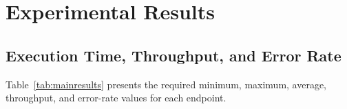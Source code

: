 \documentclass[11pt,a4paper]{article}
\begin{document}


\section{Experimental Results}

\subsection{Execution Time, Throughput, and Error Rate}

Table~\ref{tab:mainresults} presents the required minimum, maximum, average, throughput, and error-rate values for each endpoint.
\end{document}
